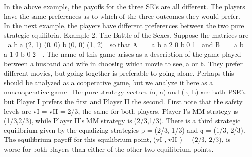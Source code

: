 \documentclass{article}
\begin{document}
In the above example, the payoffs for the three SE’s are all different. The players have
the same preferences as to which of the three outcomes they would prefer. In the next
example, the players have different preferences between the two pure strategic equilibria.
Example 2. The Battle of the Sexes. Suppose the matrices are

a b
a (2, 1) (0, 0)
b (0, 0) (1, 2) 
so that A =

a b
a 2 0
b 0 1 
and B =

a b
a 1 0
b 0 2 
.
The name of this game arises as a description of the game played between a husband
and wife in choosing which movie to see, a or b. They prefer different movies, but going
together is preferable to going alone. Perhaps this should be analyzed as a cooperative
game, but we analyze it here as a noncooperative game.
The pure strategy vectors (a, a) and (b, b) are both PSE’s but Player I prefers the first
and Player II the second.
First note that the safety levels are vI = vII = 2/3, the same for both players. Player
I’s MM strategy is (1/3,2/3), while Player II’s MM strategy is (2/3,1/3). There is a third
strategic equilibrium given by the equalizing strategies p = (2/3, 1/3) and q = (1/3, 2/3).
The equilibrium payoff for this equilibrium point, (vI , vII ) = (2/3, 2/3), is worse for both
players than either of the other two equilibrium points.
\end{document}
